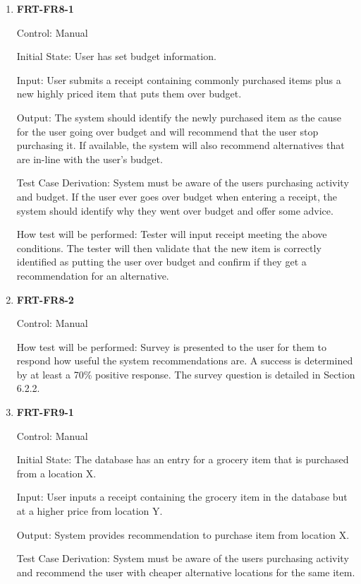 \documentclass[12pt, titlepage]{article}
\begin{document}
\begin{enumerate}

\item{\textbf{FRT-FR8-1}}

Control: Manual
          
Initial State: User has set budget information.

Input: User submits a receipt containing commonly purchased items plus a new highly priced item that puts them over budget.
          
Output: The system should identify the newly purchased item as the cause for the user going over budget and will recommend that the user stop purchasing it. If available, the system will also recommend alternatives that are in-line with the user's budget.

Test Case Derivation: System must be aware of the users purchasing activity and budget. If the user ever goes over budget when entering
a receipt, the system should identify why they went over budget and offer some advice.
          
How test will be performed: Tester will input receipt meeting the above conditions. The tester will then validate that the new item is correctly identified as putting the user over budget and confirm if they get a recommendation for an alternative.

\item{\textbf{FRT-FR8-2}}

Control: Manual

How test will be performed: Survey is presented to the user for them to respond how useful the system recommendations are. A success is determined by at least a 70\% positive response. The survey question is detailed in Section 6.2.2.

\item{\textbf{FRT-FR9-1}}

Control: Manual
          
Initial State: The database has an entry for a grocery item that is purchased from a location X.

Input: User inputs a receipt containing the grocery item in the database but at a higher price from location Y.
          
Output: System provides recommendation to purchase item from location X.

Test Case Derivation: System must be aware of the users purchasing activity and recommend the user with cheaper alternative locations for
the same item.
          

\end{enumerate}
\end{document}
